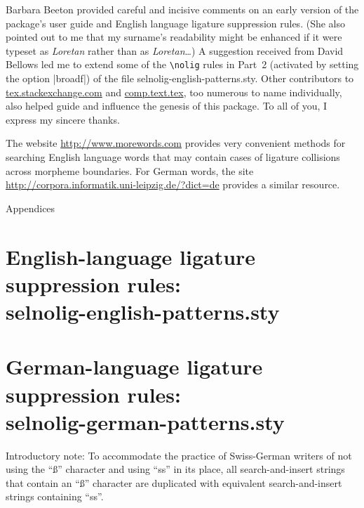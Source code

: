 \documentclass[11pt]{article}
\newcommand{\pkg}[1]{\textsf{#1}}
\newcommand{\cmmd}[1]{\texttt{\textbackslash #1}}
\let\oldappendix\appendix
\renewcommand\appendix{%
   \addtocontents{toc}{\protect{\vspace{1\baselineskip}}}
   \addtocontents{toc}{\protect{\mdseries Appendices\par}}
   \noindent
   {\Large Appendices}
   \oldappendix}
\begin{document}
Barbara Beeton provided careful and incisive comments on an early version of the package's user guide and English language ligature suppression rules. (She also pointed out to me that my surname's readability might be enhanced if it were typeset as \emph{Loretan} rather than as \emph{Lor\mbox{et}an}\dots) A suggestion received from David Bellows led me to extend some of the \cmmd{nolig} rules in Part~2 (activated by setting the option |broadf|) of the file \pkg{selnolig-english-patterns.sty}. Other contributors to \url{tex.stackexchange.com} and \url{comp.text.tex}, too numerous to name individually, also helped guide and influence the genesis of this package. To all of you, I express my sincere thanks.

The website \url{http://www.morewords.com} provides very convenient methods for searching English language words that may contain cases of ligature collisions across morpheme boundaries. For German words, the site \url{http://corpora.informatik.uni-leipzig.de/?dict=de} provides a similar resource. 



\clearpage
\appendix
\selnoligoff  %


\small %


\section[English-language ligature suppression rules: selnolig-english-patterns.sty]{English-language ligature suppression rules: \\ 
\pkg{selnolig-english-patterns.sty}}
\label{sec:eng-listing}

\begin{multicols}{2}
\end{multicols}

\clearpage
\section[German-language ligature suppression rules:
selnolig-german-patterns.sty]{German-language ligature suppression rules: \\ 
\pkg{selnolig-german-patterns.sty}}
\label{sec:germ-listing}

Introductory note: To accommodate the practice of Swiss-German writers of not using the \enquote{ß} character and using \enquote{ss} in its place, all search-and-insert strings that contain an \enquote{ß} character are duplicated with equivalent search-and-insert strings containing \enquote{ss}.
\end{document}
